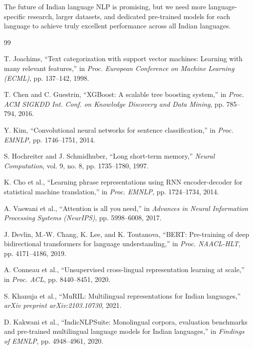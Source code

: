 \documentclass[conference]{IEEEtran}
\begin{document}
The future of Indian language NLP is promising, but we need more language-specific research, larger datasets, and dedicated pre-trained models for each language to achieve truly excellent performance across all Indian languages.

\begin{thebibliography}{99}

T. Joachims, ``Text categorization with support vector machines: Learning with many relevant features,'' in \textit{Proc. European Conference on Machine Learning (ECML)}, pp. 137--142, 1998.

T. Chen and C. Guestrin, ``XGBoost: A scalable tree boosting system,'' in \textit{Proc. ACM SIGKDD Int. Conf. on Knowledge Discovery and Data Mining}, pp. 785--794, 2016.

Y. Kim, ``Convolutional neural networks for sentence classification,'' in \textit{Proc. EMNLP}, pp. 1746--1751, 2014.

S. Hochreiter and J. Schmidhuber, ``Long short-term memory,'' \textit{Neural Computation}, vol. 9, no. 8, pp. 1735--1780, 1997.

K. Cho et al., ``Learning phrase representations using RNN encoder-decoder for statistical machine translation,'' in \textit{Proc. EMNLP}, pp. 1724--1734, 2014.

A. Vaswani et al., ``Attention is all you need,'' in \textit{Advances in Neural Information Processing Systems (NeurIPS)}, pp. 5998--6008, 2017.

J. Devlin, M.-W. Chang, K. Lee, and K. Toutanova, ``BERT: Pre-training of deep bidirectional transformers for language understanding,'' in \textit{Proc. NAACL-HLT}, pp. 4171--4186, 2019.

A. Conneau et al., ``Unsupervised cross-lingual representation learning at scale,'' in \textit{Proc. ACL}, pp. 8440--8451, 2020.

S. Khanuja et al., ``MuRIL: Multilingual representations for Indian languages,'' \textit{arXiv preprint arXiv:2103.10730}, 2021.

D. Kakwani et al., ``IndicNLPSuite: Monolingual corpora, evaluation benchmarks and pre-trained multilingual language models for Indian languages,'' in \textit{Findings of EMNLP}, pp. 4948--4961, 2020.


\end{thebibliography}
\end{document}
